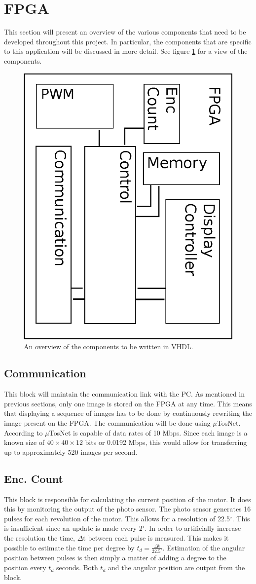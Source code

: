 \section{FPGA}
This section will present an overview of the various components that need to be developed throughout this project.
In particular, the components that are specific to this application will be discussed in more detail.
See figure \ref{fig:fpga} for a view of the components.

\begin{figure}[H]
	\centering
	\includegraphics[angle=90,width=.5\linewidth]{images/fpga_block}
	\caption{An overview of the components to be written in VHDL.}
	\label{fig:fpga}
\end{figure}

\subsection{Communication}
This block will maintain the communication link with the PC.
As mentioned in previous sections, only one image is stored on the FPGA at any time.
This means that displaying a sequence of images has to be done by continuously rewriting the image present on the FPGA.
The communication will be done using $\mu$TosNet.
According to \cite{utosnet} $\mu$TosNet is capable of data rates of 10 Mbps.
Since each image is a known size of $40\times40\times12$ bits or 0.0192 Mbps, this would allow for transferring up to approximately 520 images per second.

\subsection{Enc. Count}
This block is responsible for calculating the current position of the motor.
It does this by monitoring the output of the photo sensor.
The photo sensor generates 16 pulses for each revolution of the motor.
This allows for a resolution of 22.5$^\circ$.
This is insufficient since an update is made every 2$^\circ$.
In order to artificially increase the resolution the time, $\Delta$t between each pulse is measured.
This makes it possible to estimate the time per degree by $t_d = \frac{\Delta\text{t}}{22.5^\circ}$.
Estimation of the angular position between pulses is then simply a matter of adding a degree to the position every $t_d$ seconds.
Both $t_d$ and the angular position are output from the block.

